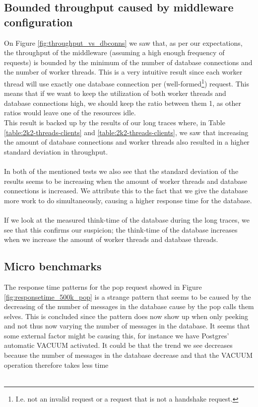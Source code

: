 \documentclass{article}
\begin{document}
        \subsection{Bounded throughput caused by middleware configuration}
            \label{sec:analysis_bound_on_throughput}
            On Figure \ref{fig:throughput_vs_dbconns} we saw that, as per our expectations, the throughput of the middleware (assuming a high enough frequency of requests) is bounded by the minimum of the number of database connections and the number of worker threads. This is a very intuitive result since each worker thread will use exactly one database connection per (well-formed\footnote{I.e. not an invalid request or a request that is not a handshake request.}) request. This means that if we want to keep the utilization of both worker threads and database connections high, we should keep the ratio between them 1, as other ratios would leave one of the resources idle.\\
            This result is backed up by the results of our long traces where, in Table \ref{table:2k2-threads-clients} and \ref{table:2k2-threads-clients}, we saw that increasing the amount of database connections and worker threads also resulted in a higher standard deviation in throughput.\\
            \\
            In both of the mentioned tests we also see that the standard deviation of the results seems to be increasing when the amount of worker threads and database connections is increased. We attribute this to the fact that we give the database more work to do simultaneously, causing a higher response time for the database.\\
            \\
            If we look at the measured think-time of the database during the long traces, we see that this confirms our suspicion; the think-time of the database increases when we increase the amount of worker threads and database threads.

        \subsection{Micro benchmarks}
            \label{sec:analysis_micro_benchmarks}
            The response time patterns for the pop request showed in Figure \ref{fig:responsetime_500k_pop} is a strange pattern that seems to be caused by the decreasing of the number of messages in the database cause by the pop calls them selves. This is concluded since the pattern does now show up when only peeking and not thus now varying the number of messages in the database. It seems that some external factor might be causing this, for instance we have Postgres' automatic VACUUM activated. It could be that the trend we see decreases because the number of messages in the database decrease and that the VACUUM operation therefore takes less time\\
            \\
\end{document}
